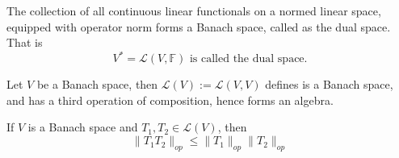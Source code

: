 \vspace{0.4cm}
\begin{definition}
    The collection of all continuous linear functionals on a normed linear space, equipped with operator norm forms a Banach space, called as the dual space. That is $$V^{*}=\mathcal{L}(V,\mathbb{F})\text{ is called the dual space.}$$
\end{definition}
\vspace{0.4cm}
\begin{definition}
    Let $V$ be a Banach space, then $\mathcal{L}(V):=\mathcal{L}(V,V)$ defines is a Banach space, and has a third operation of composition, hence forms an algebra.
\end{definition}
\vspace{0.4cm}
\begin{note}
    If $V$ is a Banach space and $T_{1},T_{2}\in \mathcal{L}(V)$, then $$\|T_{1}T_{2}\|_{op}\leq\|T_{1}\|_{op}\|T_{2}\|_{op}$$
\end{note}


